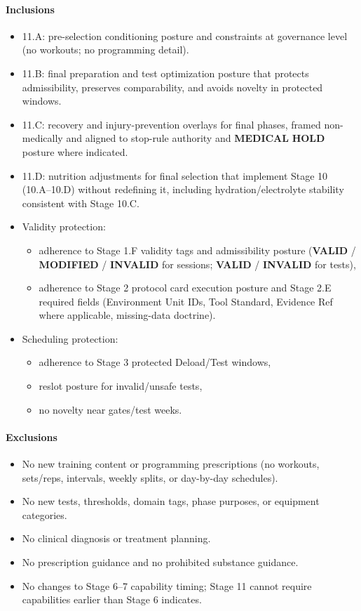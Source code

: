\documentclass[10pt]{article}
\begin{document}
\paragraph*{Inclusions}

\begin{itemize}
\item 11.A: pre-selection conditioning posture and constraints at governance level (no workouts; no programming detail).
\item 11.B: final preparation and test optimization posture that protects admissibility, preserves comparability, and avoids novelty in protected windows.
\item 11.C: recovery and injury-prevention overlays for final phases, framed non-medically and aligned to stop-rule authority and \textbf{MEDICAL} \textbf{HOLD} posture where indicated.
\item 11.D: nutrition adjustments for final selection that implement Stage 10 (10.A–10.D) without redefining it, including hydration/electrolyte stability consistent with Stage 10.C.
\item Validity protection:
\begin{itemize}
\item adherence to Stage 1.F validity tags and admissibility posture (\textbf{VALID} / \textbf{MODIFIED} / \textbf{INVALID} for sessions; \textbf{VALID} / \textbf{INVALID} for tests),
\item adherence to Stage 2 protocol card execution posture and Stage 2.E required fields (Environment Unit IDs, Tool Standard, Evidence Ref where applicable, missing-data doctrine).
\end{itemize}
\item Scheduling protection:
\begin{itemize}
\item adherence to Stage 3 protected Deload/Test windows,
\item reslot posture for invalid/unsafe tests,
\item no novelty near gates/test weeks.
\end{itemize}
\end{itemize}

\paragraph*{Exclusions}

\begin{itemize}
\item No new training content or programming prescriptions (no workouts, sets/reps, intervals, weekly splits, or day-by-day schedules).
\item No new tests, thresholds, domain tags, phase purposes, or equipment categories.
\item No clinical diagnosis or treatment planning.
\item No prescription guidance and no prohibited substance guidance.
\item No changes to Stage 6–7 capability timing; Stage 11 cannot require capabilities earlier than Stage 6 indicates.
\end{itemize}
\end{document}
